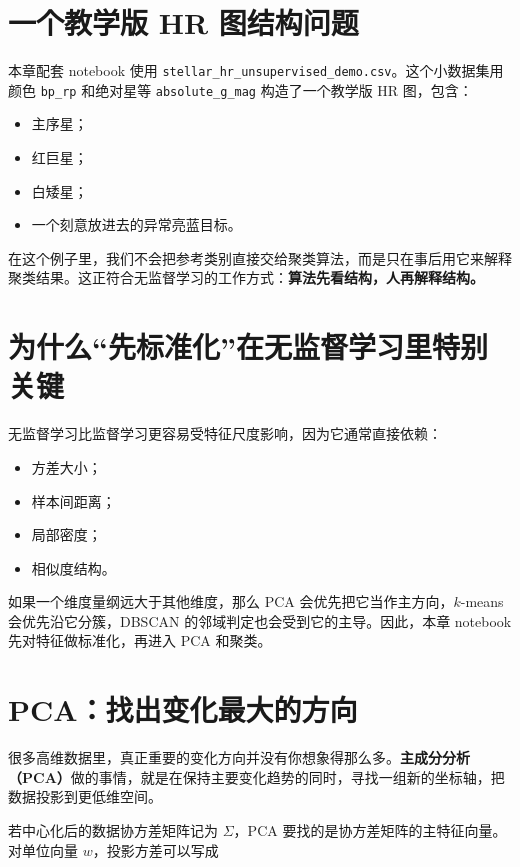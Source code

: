 \section{一个教学版 HR 图结构问题}

本章配套 notebook 使用 \nolinkurl{stellar_hr_unsupervised_demo.csv}。这个小数据集用颜色 \texttt{bp\_rp} 和绝对星等 \texttt{absolute\_g\_mag} 构造了一个教学版 HR 图，包含：

\begin{itemize}
    \item 主序星；
    \item 红巨星；
    \item 白矮星；
    \item 一个刻意放进去的异常亮蓝目标。
\end{itemize}

在这个例子里，我们不会把参考类别直接交给聚类算法，而是只在事后用它来解释聚类结果。这正符合无监督学习的工作方式：\textbf{算法先看结构，人再解释结构。}

\section{为什么“先标准化”在无监督学习里特别关键}

无监督学习比监督学习更容易受特征尺度影响，因为它通常直接依赖：

\begin{itemize}
    \item 方差大小；
    \item 样本间距离；
    \item 局部密度；
    \item 相似度结构。
\end{itemize}

如果一个维度量纲远大于其他维度，那么 PCA 会优先把它当作主方向，$k$-means 会优先沿它分簇，DBSCAN 的邻域判定也会受到它的主导。因此，本章 notebook 先对特征做标准化，再进入 PCA 和聚类。

\section{PCA：找出变化最大的方向}

很多高维数据里，真正重要的变化方向并没有你想象得那么多。\textbf{主成分分析（PCA）}做的事情，就是在保持主要变化趋势的同时，寻找一组新的坐标轴，把数据投影到更低维空间。

若中心化后的数据协方差矩阵记为 $\Sigma$，PCA 要找的是协方差矩阵的主特征向量。对单位向量 $w$，投影方差可以写成

